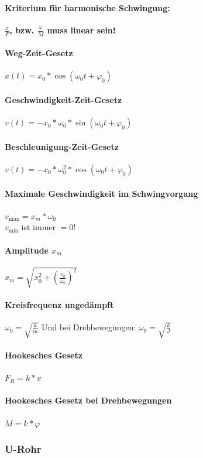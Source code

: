 \documentclass[12pt, a4paper]{scrreprt}
\begin{document}
\paragraph{Kriterium für harmonische Schwingung: } \textbf{\(\frac{x}{F}\), bzw. \(\frac{\varphi}{M}\) muss linear sein!}
\paragraph{Weg-Zeit-Gesetz} \dotfill \(x(t)=x_0 * \cos(\omega_0 t + \varphi_0)\)
\paragraph{Geschwindigkeit-Zeit-Gesetz} \dotfill \(v(t) = -x_0 * \omega_0 * \sin (\omega_0 t + \varphi_0)\)
\paragraph{Beschleunigung-Zeit-Gesetz} \dotfill \(v(t) = -x_0 * \omega_0^2 * \cos (\omega_0 t + \varphi_0)\)

\paragraph{Maximale Geschwindigkeit im Schwingvorgang} \dotfill \(v_{\max} = x_m * \omega _0\)\\
\myhspace \textcolor{myred}{\(v_{\min}\) ist immer \(= 0\)!}
\paragraph{Amplitude \(x_m\)} \dotfill \(x_m = \sqrt{x_0^2 + {\left( \frac{v_0}{\omega _0} \right)}^2}\)
\paragraph{Kreisfrequenz ungedämpft} \dotfill \(\omega_0=\sqrt{\frac{k}{m}}\) Und bei Drehbewegungen: \(\omega_0=\sqrt{\frac{k}{J}}\)
\paragraph{Hookesches Gesetz} \dotfill \(F_R=k*x\)
\paragraph{Hookesches Gesetz bei Drehbewegungen} \dotfill \(M = k * \varphi\)

\subsubsection{U-Rohr}
\end{document}
